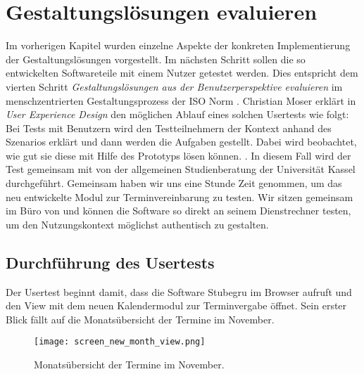 \chapter{Gestaltungslösungen evaluieren}
\label{chapter:evaluation}

Im vorherigen Kapitel wurden einzelne Aspekte der konkreten Implementierung der
Gestaltungslösungen vorgestellt. Im nächsten Schritt sollen die so entwickelten
Softwareteile mit einem Nutzer getestet werden. Dies entspricht dem vierten
Schritt \textit{Gestaltungslösungen aus der Benutzerperspektive evaluieren} im
menschzentrierten Gestaltungsprozess der ISO Norm \cite{ISO9241}. Christian
Moser erklärt in \textit{User Experience Design} den möglichen Ablauf eines
solchen Usertests wie folgt: \glqq{}Bei Tests mit Benutzern wird den
Testteilnehmern der Kontext anhand des Szenarios erklärt und dann werden die
Aufgaben gestellt. Dabei wird beobachtet, wie gut sie diese mit Hilfe des
Prototyps lösen können.\grqq{} \cite{moserTesting}. In diesem Fall wird der Test
gemeinsam mit \ipName von der allgemeinen Studienberatung der Universität
Kassel durchgeführt. Gemeinsam haben wir uns eine Stunde Zeit genommen, um das
neu entwickelte Modul zur Terminvereinbarung zu testen. Wir sitzen gemeinsam im
Büro von \ipName und können die Software so direkt an seinem Dienstrechner
testen, um den Nutzungskontext möglichst authentisch zu gestalten.

\section{Durchführung des Usertests}

Der Usertest beginnt damit, dass \ipName die Software Stubegru im Browser
aufruft und den View mit dem neuen Kalendermodul zur Terminvergabe öffnet. Sein
erster Blick fällt auf die Monatsübersicht der Termine im November.

\begin{figure}[H]
    \caption{Monatsübersicht der Termine im November.}
    \centering
    \texttt{[image: screen\_new\_month\_view.png]}
\end{figure}

